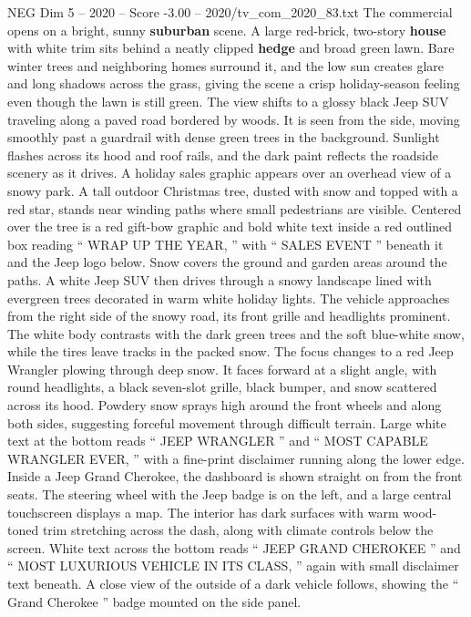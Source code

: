\begin{textsample}{NEG Dim 5 – 2020 – Score -3.00 – 2020/tv\_com\_2020\_83.txt}  \label{ex:f5_neg_040}
The commercial opens on a bright, sunny \textbf{suburban} scene.
A large red-brick, two-story \textbf{house} with white trim sits behind a neatly clipped \textbf{hedge} and broad green lawn.
Bare winter trees and neighboring homes surround it, and the low sun creates glare and long shadows across the grass, giving the scene a crisp holiday-season feeling even though the lawn is still green.
The view shifts to a glossy black Jeep SUV traveling along a paved road bordered by woods.
It is seen from the side, moving smoothly past a guardrail with dense green trees in the background.
Sunlight flashes across its hood and roof rails, and the dark paint reflects the roadside scenery as it drives.
A holiday sales graphic appears over an overhead view of a snowy park.
A tall outdoor Christmas tree, dusted with snow and topped with a red star, stands near winding paths where small pedestrians are visible.
Centered over the tree is a red gift-bow graphic and bold white text inside a red outlined box reading “ WRAP UP THE YEAR, ” with “ SALES EVENT ” beneath it and the Jeep logo below.
Snow covers the ground and garden areas around the paths.
A white Jeep SUV then drives through a snowy landscape lined with evergreen trees decorated in warm white holiday lights.
The vehicle approaches from the right side of the snowy road, its front grille and headlights prominent.
The white body contrasts with the dark green trees and the soft blue-white snow, while the tires leave tracks in the packed snow.
The focus changes to a red Jeep Wrangler plowing through deep snow.
It faces forward at a slight angle, with round headlights, a black seven-slot grille, black bumper, and snow scattered across its hood.
Powdery snow sprays high around the front wheels and along both sides, suggesting forceful movement through difficult terrain.
Large white text at the bottom reads “ JEEP WRANGLER ” and “ MOST CAPABLE WRANGLER EVER, ” with a fine-print disclaimer running along the lower edge.
Inside a Jeep Grand Cherokee, the dashboard is shown straight on from the front seats.
The steering wheel with the Jeep badge is on the left, and a large central touchscreen displays a map.
The interior has dark surfaces with warm wood-toned trim stretching across the dash, along with climate controls below the screen.
White text across the bottom reads “ JEEP GRAND CHEROKEE ” and “ MOST LUXURIOUS VEHICLE IN ITS CLASS, ” again with small disclaimer text beneath.
A close view of the outside of a dark vehicle follows, showing the “ Grand Cherokee ” badge mounted on the side panel.

\end{textsample}
